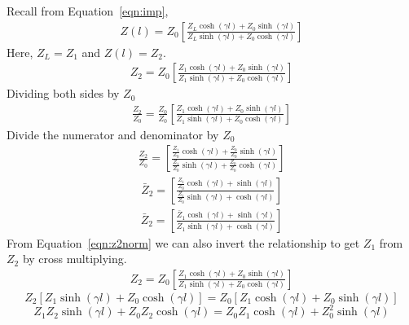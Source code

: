 Recall from Equation~\ref{eqn:imp},
\begin{align*}
Z(l) = Z_0\left[\frac{Z_L\cosh(\gamma l) + Z_0\sinh(\gamma l)}{Z_L\sinh(\gamma l) + Z_0\cosh(\gamma l)}\right]
\end{align*}
Here, $Z_L = Z_1$ and $Z(l) = Z_2$.\\
\begin{align}
Z_2 = Z_0\left[\frac{Z_1\cosh(\gamma l) + Z_0\sinh(\gamma l)}{Z_1 \sinh(\gamma l) + Z_0 \cosh(\gamma l)}\right]
\label{eqn:z2norm}
\end{align}
Dividing both sides by $Z_0$
\begin{align*}
\frac{Z_2}{Z_0} = \frac{Z_0}{Z_0} \left[\frac{Z_1\cosh(\gamma l) + Z_0\sinh(\gamma l)}{Z_1 \sinh(\gamma l) + Z_0 \cosh(\gamma l)}\right]
\end{align*}
Divide the numerator and denominator by $Z_0$
\begin{align*}
\frac{Z_2}{Z_0} = \left[\frac{\frac{Z_1}{Z_0}\cosh(\gamma l) + \frac{Z_0}{Z_0}\sinh(\gamma l)}{\frac{Z_1}{Z_0}\sinh(\gamma l) + \frac{Z_0}{Z_0}\cosh(\gamma l)}\right]
\end{align*}
\begin{align*}
\bar{Z}_2 = \left[\frac{\frac{Z_1}{Z_0}\cosh(\gamma l) + \sinh(\gamma l)}{\frac{Z_1}{Z_0}\sinh(\gamma l) + \cosh(\gamma l)}\right]
\end{align*}
\begin{align*}
\bar{Z}_2 = \left[\frac{\bar{Z}_1\cosh(\gamma l) + \sinh(\gamma l)}{\bar{Z}_1\sinh(\gamma l) + \cosh(\gamma l)}\right]
\end{align*}
From Equation~\ref{eqn:z2norm} we can also invert the relationship to get $Z_1$ from $Z_2$ by cross multiplying.
\begin{align*}
Z_2 = Z_0\left[\frac{Z_1\cosh(\gamma l) + Z_0\sinh(\gamma l)}{Z_1 \sinh(\gamma l) + Z_0 \cosh(\gamma l)}\right]
\end{align*}
\begin{dmath*}
Z_2\left[Z_1\sinh(\gamma l) + Z_0\cosh(\gamma l)\right] = Z_0\left[Z_1\cosh(\gamma l) + Z_0\sinh(\gamma l)\right]
\end{dmath*}
\[Z_1Z_2\sinh(\gamma l) + Z_0Z_2\cosh(\gamma l) = Z_0Z_1\cosh(\gamma l) + Z_0^2\sinh(\gamma l)\]

